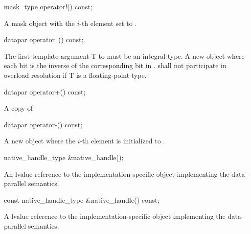 \begin{itemdecl}
mask_type operator!() const;
\end{itemdecl}
\begin{itemdescr}
  \pnum\returns A mask object with the $i$-th element set to  \foralli.
\end{itemdescr}

\begin{itemdecl}
datapar operator~() const;
\end{itemdecl}
\begin{itemdescr}
  \pnum\requires The first template argument \type T to \datapar must be an integral type.
  \pnum\returns A new \datapar object where each bit is the inverse of the corresponding bit in .
  \pnum\remarks \datapar{} shall not participate in overload resolution if \type T is a floating-point type.
\end{itemdescr}

\begin{itemdecl}
datapar operator+() const;
\end{itemdecl}
\begin{itemdescr}
  \pnum \returns A copy of 
\end{itemdescr}

\begin{itemdecl}
datapar operator-() const;
\end{itemdecl}
\begin{itemdescr}
  \pnum\returns A new \datapar object where the $i$-th element is initialized to  \foralli.
\end{itemdescr}

\begin{itemdecl}
native_handle_type &native_handle();
\end{itemdecl}
\begin{itemdescr}
  \pnum\returns An lvalue reference to the implementation-specific object implementing the data-parallel semantics.
\end{itemdescr}

\begin{itemdecl}
const native_handle_type &native_handle() const;
\end{itemdecl}
\begin{itemdescr}
  \pnum\returns A \const lvalue reference to the implementation-specific object implementing the data-parallel semantics.
\end{itemdescr}

